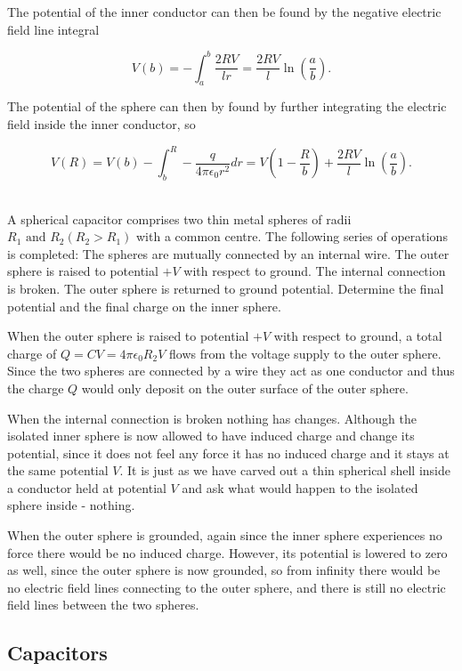 \documentclass[english,a4paper,12pt]{report}
\begin{document}
{The potential of the inner conductor can then be found by the negative electric field line integral 

\begin{equation}
    V(b) = -\int_{a}^{b} \frac{2RV}{lr} = \frac{2RV}{l} \ln \left( \frac{a}{b}  \right).
\end{equation}

The potential of the sphere can then by found by further integrating the electric field inside the inner conductor, so 

\begin{equation}
    V(R) = V(b) - \int_{b}^{R} -\frac{q}{4\pi \epsilon_0 r^2}dr = V\left( 1-\frac{R}{b}  \right)  + \frac{2RV}{l} \ln \left( \frac{a}{b}  \right).
\end{equation}
~
} 

{A spherical capacitor comprises two thin metal spheres of radii \(R_1 \text { and } R_2 (R_2 > R_1 )\) with
a common centre. The following series of operations is completed: The spheres are
mutually connected by an internal wire. The outer sphere is raised to potential \(+V\) with
respect to ground. The internal connection is broken. The outer sphere is returned to
ground potential. Determine the final potential and the final charge on the inner sphere.}
{When the outer sphere is raised to potential \(+V\) with respect to ground, a total charge of \(Q=CV=4\pi \epsilon_0 R_2 V\) flows from the voltage supply to the outer sphere. Since the two spheres are connected by a wire they act as one conductor and thus the charge \(Q\) would only deposit on the outer surface of the outer sphere.

When the internal connection is broken nothing has changes. Although the isolated inner sphere is now allowed to have induced charge and change its potential, since it does not feel any force it has no induced charge and it stays at the same potential \(V\). It is just as we have carved out a thin spherical shell inside a conductor held at potential \(V\) and ask what would happen to the isolated sphere inside - nothing.

When the outer sphere is grounded, again since the inner sphere experiences no force there would be no induced charge. However, its potential is lowered to zero as well, since the outer sphere is now grounded, so from infinity there would be no electric field lines connecting to the outer sphere, and there is still no electric field lines between the two spheres.} 

\subsection{Capacitors}
\end{document}
